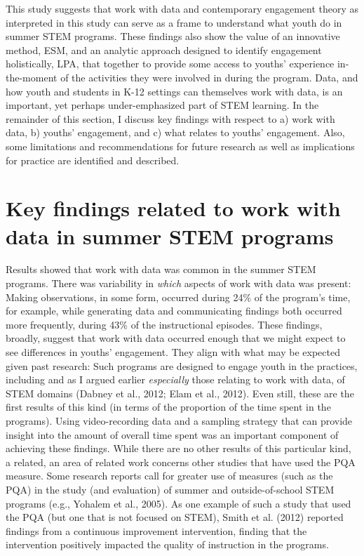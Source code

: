 \documentclass[]{msu-thesis}
\theoremstyle{definition}
\theoremstyle{definition}
\theoremstyle{definition}
\theoremstyle{remark}
\begin{document}
This study suggests that work with data and contemporary engagement
theory as interpreted in this study can serve as a frame to understand
what youth do in summer STEM programs. These findings also show the
value of an innovative method, ESM, and an analytic approach designed to
identify engagement holistically, LPA, that together to provide some
access to youths' experience in-the-moment of the activities they were
involved in during the program. Data, and how youth and students in K-12
settings can themselves work with data, is an important, yet perhaps
under-emphasized part of STEM learning. In the remainder of this
section, I discuss key findings with respect to a) work with data, b)
youths' engagement, and c) what relates to youths' engagement. Also,
some limitations and recommendations for future research as well as
implications for practice are identified and described.

\section{Key findings related to work with data in summer STEM
programs}\label{key-findings-related-to-work-with-data-in-summer-stem-programs}

Results showed that work with data was common in the summer STEM
programs. There was variability in \emph{which} aspects of work with
data was present: Making observations, in some form, occurred during
24\% of the program's time, for example, while generating data and
communicating findings both occurred more frequently, during 43\% of the
instructional episodes. These findings, broadly, suggest that work with
data occurred enough that we might expect to see differences in youths'
engagement. They align with what may be expected given past research:
Such programs are designed to engage youth in the practices, including
and as I argued earlier \emph{especially} those relating to work with
data, of STEM domains (Dabney et al., 2012; Elam et al., 2012). Even
still, these are the first results of this kind (in terms of the
proportion of the time spent in the programs). Using video-recording
data and a sampling strategy that can provide insight into the amount of
overall time spent was an important component of achieving these
findings. While there are no other results of this particular kind, a
related, an area of related work concerns other studies that have used
the PQA measure. Some research reports call for greater use of measures
(such as the PQA) in the study (and evaluation) of summer and
outside-of-school STEM programs (e.g., Yohalem et al., 2005). As one
example of such a study that used the PQA (but one that is not focused
on STEM), Smith et al. (2012) reported findings from a continuous
improvement intervention, finding that the intervention positively
impacted the quality of instruction in the programs.
\end{document}
